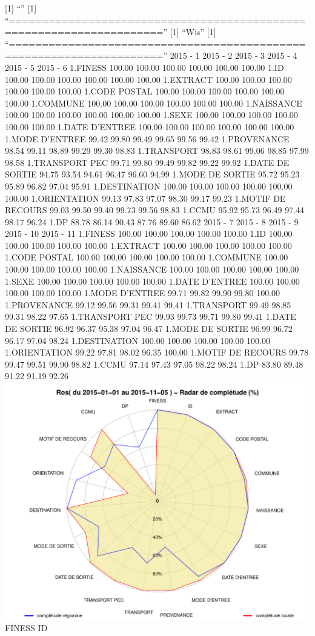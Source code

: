 \documentclass[]{article}
\begin{document}
{[}1{]} ``'' {[}1{]}
``=====================================================================''
{[}1{]} ``Wis'' {[}1{]}
``=====================================================================''
2015 - 1 2015 - 2 2015 - 3 2015 - 4 2015 - 5 2015 - 6 1.FINESS 100.00
100.00 100.00 100.00 100.00 100.00 1.ID 100.00 100.00 100.00 100.00
100.00 100.00 1.EXTRACT 100.00 100.00 100.00 100.00 100.00 100.00 1.CODE
POSTAL 100.00 100.00 100.00 100.00 100.00 100.00 1.COMMUNE 100.00 100.00
100.00 100.00 100.00 100.00 1.NAISSANCE 100.00 100.00 100.00 100.00
100.00 100.00 1.SEXE 100.00 100.00 100.00 100.00 100.00 100.00 1.DATE
D'ENTREE 100.00 100.00 100.00 100.00 100.00 100.00 1.MODE D'ENTREE 99.42
99.80 99.49 99.65 99.56 99.42 1.PROVENANCE 98.54 99.11 98.89 99.29 99.30
98.83 1.TRANSPORT 98.83 98.61 99.06 98.85 97.99 98.58 1.TRANSPORT PEC
99.71 99.80 99.49 99.82 99.22 99.92 1.DATE DE SORTIE 94.75 93.54 94.61
96.47 96.60 94.99 1.MODE DE SORTIE 95.72 95.23 95.89 96.82 97.04 95.91
1.DESTINATION 100.00 100.00 100.00 100.00 100.00 100.00 1.ORIENTATION
99.13 97.83 97.07 98.30 99.17 99.23 1.MOTIF DE RECOURS 99.03 99.50 99.40
99.73 99.56 98.83 1.CCMU 95.92 95.73 96.49 97.44 98.17 96.24 1.DP 88.78
86.14 90.43 87.76 89.60 86.62 2015 - 7 2015 - 8 2015 - 9 2015 - 10 2015
- 11 1.FINESS 100.00 100.00 100.00 100.00 100.00 1.ID 100.00 100.00
100.00 100.00 100.00 1.EXTRACT 100.00 100.00 100.00 100.00 100.00 1.CODE
POSTAL 100.00 100.00 100.00 100.00 100.00 1.COMMUNE 100.00 100.00 100.00
100.00 100.00 1.NAISSANCE 100.00 100.00 100.00 100.00 100.00 1.SEXE
100.00 100.00 100.00 100.00 100.00 1.DATE D'ENTREE 100.00 100.00 100.00
100.00 100.00 1.MODE D'ENTREE 99.71 99.82 99.90 99.80 100.00
1.PROVENANCE 99.12 99.56 99.31 99.41 99.41 1.TRANSPORT 99.49 98.85 99.31
98.22 97.65 1.TRANSPORT PEC 99.93 99.73 99.71 99.80 99.41 1.DATE DE
SORTIE 96.92 96.37 95.38 97.04 96.47 1.MODE DE SORTIE 96.99 96.72 96.17
97.04 98.24 1.DESTINATION 100.00 100.00 100.00 100.00 100.00
1.ORIENTATION 99.22 97.81 98.02 96.35 100.00 1.MOTIF DE RECOURS 99.78
99.47 99.51 99.90 98.82 1.CCMU 97.14 97.43 97.05 98.22 98.24 1.DP 83.80
89.48 91.22 91.19 92.26
\includegraphics{completude_files/figure-latex/finess-10.pdf} FINESS ID
\end{document}
